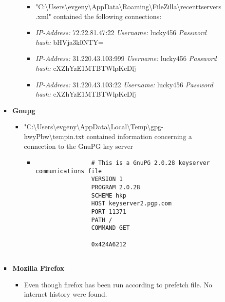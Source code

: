 \begin{enumerate}
\begin{itemize}
\begin{itemize}
\begin{itemize}
			\begin{itemize}
				\item "C:\textbackslash Users\textbackslash evgeny\textbackslash AppData\textbackslash Roaming\textbackslash FileZilla\textbackslash recenttservers.xml" contained the following connections:
				\item \textit{IP-Address:} 72.22.81.47:22 \textit{Username:} lucky456 \textit{Password hash:} bHVja3k0NTY=
				\item \textit{IP-Address:} 31.220.43.103:999 \textit{Username:} lucky456 \textit{Password hash:} cXZhYzE1MTBTWlpKcDlj
				\item \textit{IP-Address:} 31.220.43.103:22 \textit{Username:} lucky456 \textit{Password hash:} cXZhYzE1MTBTWlpKcDlj\\
			\end{itemize}
		\end{itemize}
		\item \textbf{Gnupg}
		\begin{itemize}
			\item "C:\textbackslash Users\textbackslash evgeny\textbackslash AppData\textbackslash Local\textbackslash Temp\textbackslash gpg-hwyPbw\textbackslash tempin.txt contained information concerning a connection to the GnuPG key server
			\begin{itemize}
				\item \begin{verbatim}
				# This is a GnuPG 2.0.28 keyserver communications file
				VERSION 1
				PROGRAM 2.0.28
				SCHEME hkp
				HOST keyserver2.pgp.com
				PORT 11371
				PATH /
				COMMAND GET
				
				0x424A6212
				
				\end{verbatim}
			\end{itemize}
			
		\end{itemize}
		
		
		\item \textbf{Mozilla Firefox}
		\begin{itemize}
			\item Even though firefox has been run according to prefetch file. No internet history were found.
		\end{itemize}
		

\end{itemize}
\end{itemize}
\end{enumerate}
